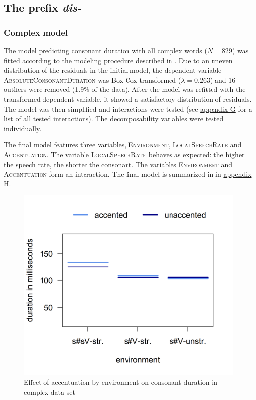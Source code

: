 \subsection{The prefix \textit{dis-} }


\subsubsection{Complex model}

The model predicting consonant duration with all complex words ($N=829$) was fitted according to the modeling procedure described in . Due to an uneven distribution of the residuals in the initial model, the dependent variable \textsc{AbsoluteConsonantDuration} was Box-Cox-transformed ($\lambda = 0.263$) and 16 outliers were removed (1.9\% of the data). After the model was refitted with the transformed dependent variable, it showed a satisfactory distribution of residuals. The model was then simplified and interactions were tested (see \hyperref[Appendix G Summaries of tested interactions in experimental study]{appendix G} for a list of all tested interactions). The decomposability variables were tested individually.

The final model features three variables, \textsc{Environment}, \textsc{LocalSpeechRate} and \textsc{Accentuation}. The variable \textsc{LocalSpeechRate} behaves as expected: the higher the speech rate, the shorter the consonant. The variables \textsc{Environment} and \textsc{Accentuation} form an interaction. The final model is summarized in  in \hyperref[Appendix H: Model Summaries Experiment]{appendix H}.






\begin{figure} [t!]
	\centering
	\includegraphics [scale=0.5] {images/Experiment/DisModelInterEnvAcc}
	\caption{Effect of accentuation by environment on consonant duration in complex data set}
	\label{fig:NumNasal disComplex experiment}
\end{figure}



